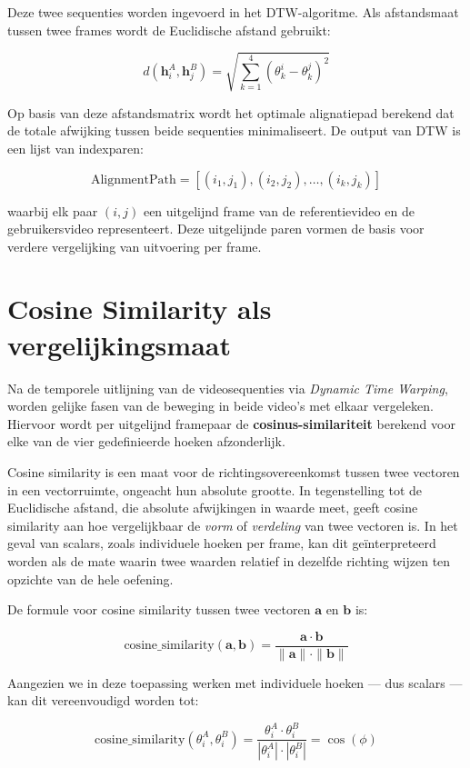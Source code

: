 Deze twee sequenties worden ingevoerd in het DTW-algoritme. 
Als afstandsmaat tussen twee frames wordt de Euclidische afstand gebruikt:

\[
d(\mathbf{h}_i^A, \mathbf{h}_j^B) = \sqrt{\sum_{k=1}^4 (\theta_k^i - \theta_k^j)^2}
\]

Op basis van deze afstandsmatrix wordt het optimale alignatiepad berekend dat de totale afwijking tussen beide sequenties minimaliseert. 
De output van DTW is een lijst van indexparen:

\[
\text{AlignmentPath} = [(i_1, j_1), (i_2, j_2), \dots, (i_k, j_k)]
\]

waarbij elk paar $(i, j)$ een uitgelijnd frame van de referentievideo en de gebruikersvideo representeert. 
Deze uitgelijnde paren vormen de basis voor verdere vergelijking van uitvoering per frame.

\section{Cosine Similarity als vergelijkingsmaat}
Na de temporele uitlijning van de videosequenties via \textit{Dynamic Time Warping}, worden gelijke fasen van de beweging in beide video's met elkaar vergeleken. 
Hiervoor wordt per uitgelijnd framepaar de \textbf{cosinus-similariteit} berekend voor elke van de vier gedefinieerde hoeken afzonderlijk.

Cosine similarity is een maat voor de richtingsovereenkomst tussen twee vectoren in een vectorruimte, ongeacht hun absolute grootte. 
In tegenstelling tot de Euclidische afstand, die absolute afwijkingen in waarde meet, geeft cosine similarity aan hoe vergelijkbaar de \textit{vorm} of \textit{verdeling} van twee vectoren is. 
In het geval van scalars, zoals individuele hoeken per frame, kan dit geïnterpreteerd worden als de mate waarin twee waarden relatief in dezelfde richting wijzen ten opzichte van de hele oefening.

De formule voor cosine similarity tussen twee vectoren $\mathbf{a}$ en $\mathbf{b}$ is:

\[
\text{cosine\_similarity}(\mathbf{a}, \mathbf{b}) = \frac{\mathbf{a} \cdot \mathbf{b}}{\|\mathbf{a}\| \cdot \|\mathbf{b}\|}
\]

Aangezien we in deze toepassing werken met individuele hoeken — dus scalars — kan dit vereenvoudigd worden tot:

\[
\text{cosine\_similarity}(\theta_i^A, \theta_i^B) = \frac{\theta_i^A \cdot \theta_i^B}{|\theta_i^A| \cdot |\theta_i^B|} = \cos(\phi)
\]

